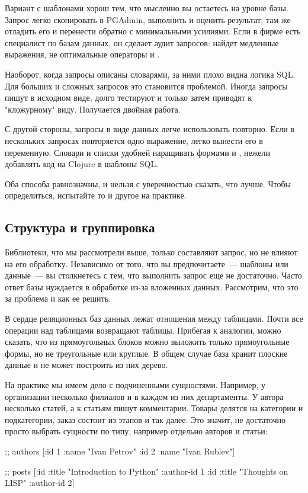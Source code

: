 Вариант с шаблонами хорош тем, что мысленно вы остаетесь на уровне базы. Запрос легко скопировать в PGAdmin, выполнить и оценить результат; там же отладить его и перенести обратно с минимальными усилиями. Если в фирме есть специалист по базам данных, он сделает аудит запросов: найдет медленные выражения, не оптимальные операторы  и .

Наоборот, когда запросы описаны словарями, за ними плохо видна логика SQL. Для больших и сложных запросов это становится проблемой. Иногда запросы пишут в исходном виде, долго тестируют и только затем приводят к "кложурному" виду. Получается двойная работа.

С другой стороны, запросы в виде данных легче использовать повторно. Если в нескольких запросах повторяется одно выражение, легко вынести его в переменную. Словари и списки удобней наращивать формами  и , нежели добавлять код на Clojure в шаблоны SQL.

Оба способа равнозначны, и нельзя с уверенностью сказать, что лучше. Чтобы определиться, испытайте то и другое на практике.

\subsection{Структура и группировка}

Библиотеки, что мы рассмотрели выше, только составляют запрос, но не влияют на его обработку. Независимо от того, что вы предпочитаете~--- шаблоны или данные~--- вы столкнетесь с тем, что выполнить запрос еще не достаточно. Часто ответ базы нуждается в обработке из-за вложенных данных. Рассмотрим, что это за проблема и как ее решить.

В сердце реляционных баз данных лежат отношения между таблицами. Почти все операции над таблицами возвращают таблицы. Прибегая к аналогии, можно сказать, что из прямоугольных блоков можно выложить только прямоугольные формы, но не треугольные или круглые. В общем случае база хранит плоские данные и не может построить из них дерево.

На практике мы имеем дело с подчиненными сущностями. Например, у организации несколько филиалов и в каждом из них департаменты. У автора несколько статей, а к статьям пишут комментарии. Товары делятся на категории и подкатегории, заказ состоит из этапов и так далее. Это значит, не достаточно просто выбрать сущности по типу, например отдельно авторов и статьи:

\begin{english}
  \begin{clojure}
;; authors
[{:id 1 :name "Ivan Petrov"}
 {:id 2 :name "Ivan Rublev"}]

;; posts
[{:id :title "Introduction to Python" :author-id 1}
 {:id :title "Thoughts on LISP" :author-id 2}]
  \end{clojure}
\end{english}

